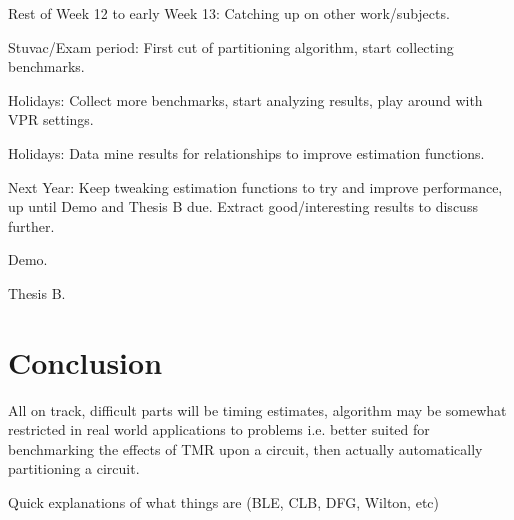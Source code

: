 \documentclass[12pt,drafta4paper,oneside]{memoir} %
\begin{document}
Rest of Week 12 to early Week 13: Catching up on other work/subjects.

Stuvac/Exam period: First cut of partitioning algorithm, start collecting benchmarks.

Holidays: Collect more benchmarks, start analyzing results, play around with \ac{VPR} settings.

Holidays: Data mine results for relationships to improve estimation functions.

Next Year: Keep tweaking estimation functions to try and improve performance, up until Demo and Thesis B due. Extract good/interesting results to discuss further.

Demo.

Thesis B.
\chapter{Conclusion}
All on track, difficult parts will be timing estimates, algorithm may be somewhat restricted in real world applications to problems i.e. better suited for benchmarking the effects of TMR upon a circuit, then actually automatically partitioning a circuit.

Quick explanations of what things are (BLE, CLB, DFG, Wilton, etc)



\end{document}
